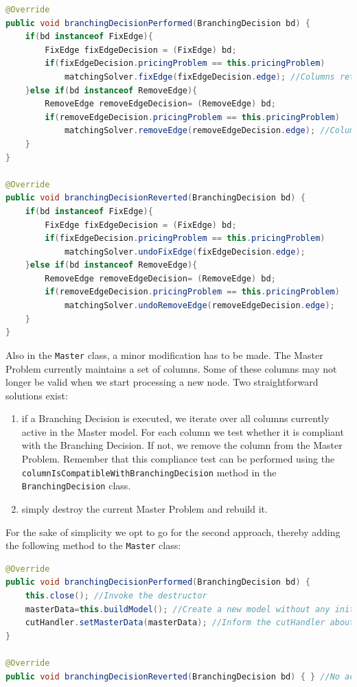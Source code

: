 \documentclass[a4paper]{article}
\newenvironment{myblock}[1]{%
    \tcolorbox[beamer,%
    noparskip,breakable,
    colback=lightBlueCodeBlock,colframe=darkBlueCodeBlock,%
    colbacklower=darkBlueCodeBlock!75!lightBlueCodeBlock,%
    coltitle=blueTitleCodeBlock,
    title=#1]}%
    {\endtcolorbox}
\newcommand{\code}[1]{\lstinline[language=java, style=seminar]!#1!}
\begin{document}
\begin{myblock}{ExactPricingProblemSolver continued}
\begin{lstlisting}[language=java, style=eclipseArticle, xleftmargin=2em]  
@Override
public void branchingDecisionPerformed(BranchingDecision bd) {
	if(bd instanceof FixEdge){
		FixEdge fixEdgeDecision = (FixEdge) bd;
		if(fixEdgeDecision.pricingProblem == this.pricingProblem)
			matchingSolver.fixEdge(fixEdgeDecision.edge); //Columns returned must contains this edge.
	}else if(bd instanceof RemoveEdge){
		RemoveEdge removeEdgeDecision= (RemoveEdge) bd;
		if(removeEdgeDecision.pricingProblem == this.pricingProblem)
			matchingSolver.removeEdge(removeEdgeDecision.edge); //Columns returned CANNOT contain this edge.
	}
}

@Override
public void branchingDecisionReverted(BranchingDecision bd) {
	if(bd instanceof FixEdge){
		FixEdge fixEdgeDecision = (FixEdge) bd;
		if(fixEdgeDecision.pricingProblem == this.pricingProblem)
			matchingSolver.undoFixEdge(fixEdgeDecision.edge);
	}else if(bd instanceof RemoveEdge){
		RemoveEdge removeEdgeDecision= (RemoveEdge) bd;
		if(removeEdgeDecision.pricingProblem == this.pricingProblem)
			matchingSolver.undoRemoveEdge(removeEdgeDecision.edge);
	}
}
\end{lstlisting}
\end{myblock}
Also in the \code{Master} class, a minor modification has to be made. The Master Problem currently maintains a set of columns. Some of these columns may not longer be valid when we start processing a new node. Two straightforward solutions exist:
\begin{enumerate}
 \item if a Branching Decision is executed, we iterate over all columns currently active in the Master model. For each column we test whether it is compliant with the Branching Decision. If not, we remove the column from the Master Problem. Remember that this compliance test can be performed using the \code{columnIsCompatibleWithBranchingDecision} method in the \code{BranchingDecision} class.
 \item simply destroy the current Master Problem and rebuild it.
\end{enumerate}
For the sake of simplicity we opt to go for the second approach, thereby adding the following method to the \code{Master} class:
\begin{myblock}{Master continued}
\begin{lstlisting}[language=java, style=eclipseArticle, xleftmargin=2em]  
@Override
public void branchingDecisionPerformed(BranchingDecision bd) {
	this.close(); //Invoke the destructor
	masterData=this.buildModel(); //Create a new model without any initialColumns
	cutHandler.setMasterData(masterData); //Inform the cutHandler about the new master model
}

@Override
public void branchingDecisionReverted(BranchingDecision bd) { } //No action required
\end{lstlisting}
\end{myblock}
\end{document}
